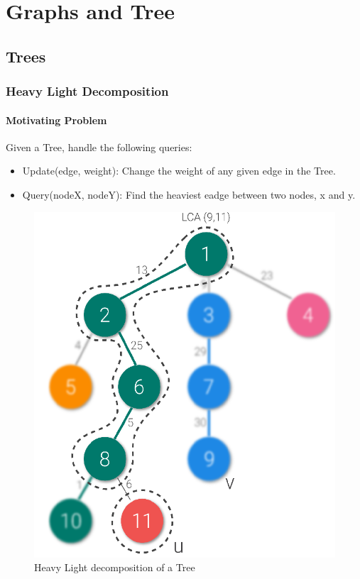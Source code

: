 \chapter{Graphs and Tree}



\section{Trees}


\subsection{Heavy Light Decomposition}

\subsubsection{Motivating Problem}

Given a Tree, handle the following queries:
\begin{itemize}
  \item Update(edge, weight): Change the weight of any given edge in the Tree.
  \item Query(nodeX, nodeY): Find the heaviest eadge between two nodes, x and y.
\end{itemize}

\begin{figure}[h]
  \begin{center}
    \includegraphics[scale=0.2]{img/heavy-light-decomposition.png}
  \end{center}
  \caption{Heavy Light decomposition of a Tree}
\end{figure}


